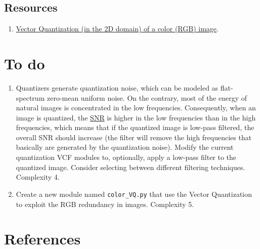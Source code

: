 \subsection*{Resources}

\begin{enumerate}
\item
  \href{https://github.com/vicente-gonzalez-ruiz/vector_quantization/blob/main/docs/spatial_color_VQ.ipynb}{Vector
    Quantization (in the 2D domain) of a color (RGB) image}.
\end{enumerate}


\section*{To do}
\begin{enumerate}
\item Quantizers generate quantization noise, which can be modeled as
  flat-spectrum zero-mean uniform noise. On the contrary, most of the
  energy of natural images is concentrated in the low
  frequencies. Consequently, when an image is quantized, the
  \href{https://en.wikipedia.org/wiki/Signal-to-noise_ratio}{SNR} is
  higher in the low frequencies than in the high frequencies, which
  means that if the quantized image is low-pass filtered, the overall
  SNR should increase (the filter will remove the high frequencies
  that basically are generated by the quantization noise). Modify the
  current quantization VCF modules to, optionally, apply a low-pass
  filter to the quantized image. Consider selecting between different
  filtering techniques. Complexity 4.

\item Create a new module named \texttt{color\_VQ.py} that use the
  Vector Quantization to exploit the $\text{RGB}$ redundancy in
  images. Complexity 5.
\end{enumerate}

\section{References}

\renewcommand{\addcontentsline}[3]{}%

